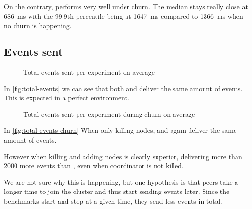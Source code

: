 On the contrary, \epto performs very well under churn. The median stays really close at \SI{686}{\milli\second} with the 99.9th percentile being at \SI{1647}{\milli\second} compared to \SI{1366}{\milli\second} when no churn is happening.
\newpage
\subsection{Events sent}
\begin{figure}[h]
	\centering
	
	\vspace{-2mm} 
	\caption{Total events sent per experiment on average}
	\vspace{-2mm}
	\label{fig:total-events}   
\end{figure}
In \autoref{fig:total-events} we can see that both \epto and \jgroups deliver the same amount of events. This is expected in a perfect environment.
\begin{figure}[h]
	\centering
	
	\vspace{-2mm} 
	\caption{Total events sent per experiment during churn on average}
	\vspace{-2mm}
	\label{fig:total-events-churn}  
\end{figure}

In \autoref{fig:total-events-churn} When only killing nodes, \epto and \jgroups again deliver the same amount of events.

However when killing and adding nodes \epto is clearly superior, delivering more than 2000 more events than \jgroups, even when \jgroups coordinator is not killed.

We are not sure why this is happening, but one hypothesis is that \jgroups peers take a longer time to join the cluster and thus start sending events later. Since the benchmarks start and stop at a given time, they send less events in total.
